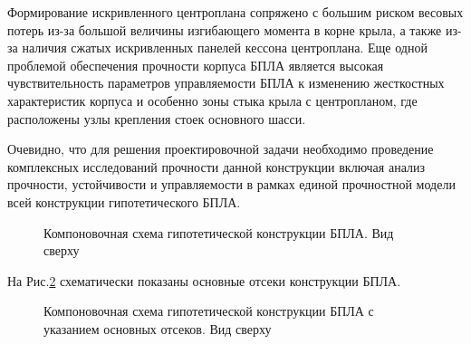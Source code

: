 Формирование искривленного центроплана сопряжено с большим риском весовых потерь из-за большой величины изгибающего момента в корне крыла, а также из-за наличия сжатых искривленных панелей кессона центроплана. Еще одной проблемой обеспечения прочности корпуса БПЛА является высокая чувствительность параметров управляемости БПЛА к изменению жесткостных характеристик корпуса и особенно зоны стыка крыла с центропланом, где расположены узлы крепления стоек основного шасси. 

Очевидно, что для решения проектировочной задачи необходимо проведение комплексных исследований прочности данной конструкции включая анализ прочности, устойчивости и управляемости в рамках единой прочностной модели всей конструкции гипотетического БПЛА. 



\begin{figure}[H]
\centering
\def\svgwidth{0.9\textwidth}

\caption{Компоновочная схема гипотетической конструкции БПЛА. Вид сверху}
\label{fig:BPS_Catia_Top_WithoutSkin}
\end{figure}
 

На Рис.\ref{fig:BPS_Catia_Top_PartRoles} схематически показаны основные отсеки конструкции БПЛА. 

\begin{figure}[H]
\centering
\def\svgwidth{0.9\textwidth}

\caption{Компоновочная схема гипотетической конструкции БПЛА с указанием основных отсеков. Вид сверху}
\label{fig:BPS_Catia_Top_PartRoles}
\end{figure}
